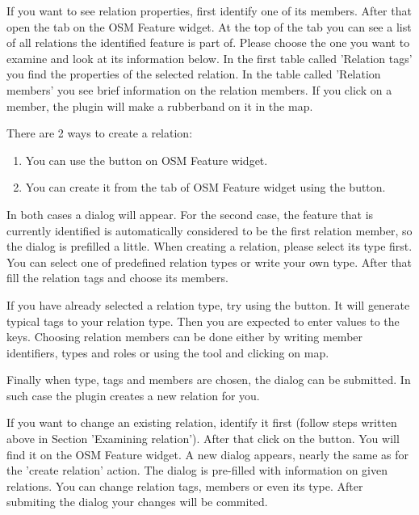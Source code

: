 \label{examrelation}

If you want to see relation properties, first identify one of its members.
After that open the  tab on the OSM Feature widget. At the 
top of the tab you can see a list of all relations the identified feature 
is part of. Please choose the one you want to examine and look at its 
information below. In the first table called 'Relation tags' you find the 
properties of the selected relation. In the table called 'Relation members' 
you see brief information on the relation members. If you click on a member, 
the plugin will make a rubberband on it in the map.


There are 2 ways to create a relation: 

\begin{enumerate}
\item You can use the  
button on OSM Feature widget.
\item You can create it from the  tab of OSM Feature widget 
using the  button.   
\end{enumerate}

In both cases a dialog will appear. For the second case, the feature that 
is currently identified is automatically considered to be the first 
relation member, so the dialog is prefilled a little. When creating 
a relation, please select its type first. You can select one of 
predefined relation types or write your own type. After that fill the 
relation tags and choose its members.

If you have already selected a relation type, try using the 
 button. It will generate typical 
tags to your relation type. Then you are expected to enter values to the 
keys. Choosing relation members can be done either by writing member 
identifiers, types and roles or using the  
tool and clicking on map.

Finally when type, tags and members are chosen, the dialog can be submitted.
In such case the plugin creates a new relation for you.


If you want to change an existing relation, identify it first (follow steps
written above in Section 'Examining relation'). After that click on the 
 button. You will find it 
on the OSM Feature widget. A new dialog appears, nearly the same as for the 
'create relation' action. The dialog is pre-filled with information on 
given relations. You can change relation tags, members or even its type. 
After submiting the dialog your changes will be commited.

